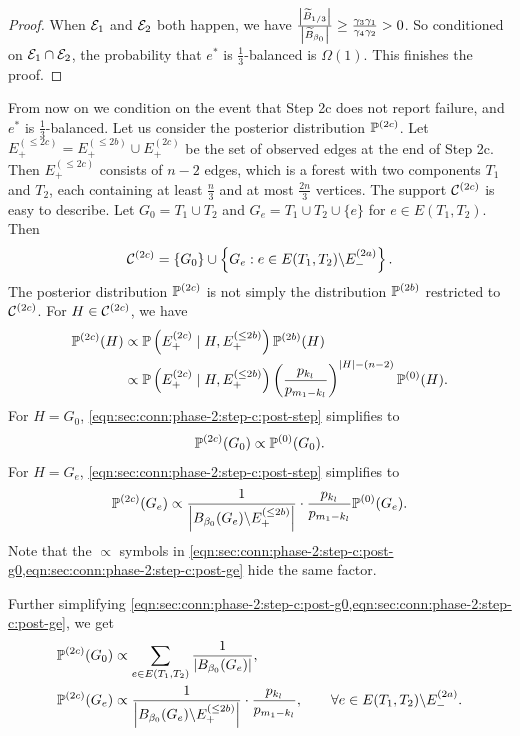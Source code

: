 \begin{proof}
  When $\mathcal{E}_1$ and $\mathcal{E}_2$ both happen, we have
  $
    \frac{\left|\widetilde B_{1/3}\right|}{\left|\widetilde B_{\beta_0}\right|} \ge \frac{\gamma_3 \gamma_1}{\gamma_4 \gamma_2} > 0
  $.
  So conditioned on $\mathcal{E}_1\cap \mathcal{E}_2$, the probability that $e^*$ is $\frac 13$-balanced is $\Omega(1)$.
  This finishes the proof.
\end{proof}

From now on we condition on the event that Step 2c does not report failure, and $e^*$ is $\frac 13$-balanced.
Let us consider the posterior distribution $\mathbb{P}^{(2c)}$.
Let $E^{(\le 2c)}_+ = E^{(\le 2b)}_+ \cup E^{(2c)}_+$ be the set of observed edges at the end of Step 2c.
Then $E^{(\le 2c)}_+$ consists of $n-2$ edges, which is a forest with two components $T_1$ and $T_2$, each containing at least $\frac n3$ and at most $\frac{2n}3$ vertices.
The support $\mathcal{C}^{(2c)}$ is easy to describe.
Let $G_0 = T_1 \cup T_2$ and $G_e = T_1 \cup T_2 \cup \{e\}$ for $e\in E(T_1, T_2)$.
Then
\begin{align*}
  \mathcal{C}^{(2c)} = \left\{G_0\right\} \cup \left\{G_e : e\in E(T_1,T_2)\backslash E^{(2a)}_-\right\}.
\end{align*}
The posterior distribution $\mathbb{P}^{(2c)}$ is not simply the distribution $\mathbb{P}^{(2b)}$ restricted to $\mathcal{C}^{(2c)}$.
For $H\in \mathcal{C}^{(2c)}$, we have
\begin{align} \label{eqn:sec:conn:phase-2:step-c:post-step}
  \mathbb{P}^{(2c)}(H) &\propto \mathbb{P}\left( E^{(2c)}_+ \mid H, E^{(\le 2b)}_+\right) \mathbb{P}^{(2b)}(H) \\
  \nonumber &\propto \mathbb{P}\left( E^{(2c)}_+ \mid H, E^{(\le 2b)}_+\right) \left(\frac{p_{k_l}}{p_{m_1-k_l}}\right)^{|H|-(n-2)} \mathbb{P}^{(0)}(H).
\end{align}
For $H=G_0$, \cref{eqn:sec:conn:phase-2:step-c:post-step} simplifies to
\begin{align} \label{eqn:sec:conn:phase-2:step-c:post-g0}
  \mathbb{P}^{(2c)}(G_0) \propto \mathbb{P}^{(0)}(G_0).
\end{align}
For $H=G_e$, \cref{eqn:sec:conn:phase-2:step-c:post-step} simplifies to
\begin{align} \label{eqn:sec:conn:phase-2:step-c:post-ge}
  \mathbb{P}^{(2c)}(G_e) \propto \frac 1{\left| B_{\beta_0}(G_e) \backslash E^{(\le 2b)}_+ \right|} \cdot \frac{p_{k_l}}{p_{m_1-k_l}} \mathbb{P}^{(0)}(G_e).
\end{align}
Note that the $\propto$ symbols in \cref{eqn:sec:conn:phase-2:step-c:post-g0,eqn:sec:conn:phase-2:step-c:post-ge} hide the same factor.

Further simplifying \cref{eqn:sec:conn:phase-2:step-c:post-g0,eqn:sec:conn:phase-2:step-c:post-ge}, we get
\begin{align}
  \label{eqn:sec:conn:phase-2:step-c:post-g0-2} \mathbb{P}^{(2c)}(G_0) &\propto \sum_{e\in E(T_1,T_2)} \frac 1{\left| B_{\beta_0}(G_e) \right|}, \\
  \label{eqn:sec:conn:phase-2:step-c:post-ge-2} \mathbb{P}^{(2c)}(G_e) &\propto \frac 1{\left| B_{\beta_0}(G_e) \backslash E^{(\le 2b)}_+ \right|} \cdot \frac{p_{k_l}}{p_{m_1-k_l}}, \qquad \forall e\in E(T_1,T_2) \backslash E^{(2a)}_-.
\end{align}

